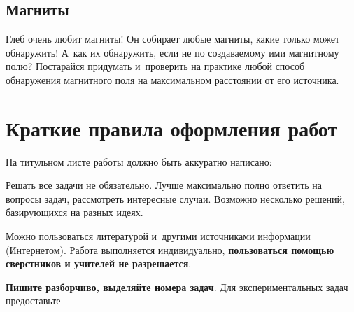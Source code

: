 \documentclass[a4paper,12pt]{article}
\begin{document}
\subsection{Магниты}
Глеб очень любит магниты! Он собирает любые магниты, какие только может обнаружить!
А~как их обнаружить, если не по создаваемому ими магнитному полю? Постарайся придумать
и~проверить на практике любой способ обнаружения магнитного поля
на максимальном расстоянии от его источника.


\section*{Краткие правила оформления работ}
\footnotesize
На титульном листе работы должно быть аккуратно написано:

Решать все задачи не обязательно. Лучше максимально полно ответить на вопросы задач,
рассмотреть интересные случаи. Возможно несколько решений, базирующихся
на разных идеях.

Можно пользоваться литературой и~другими источниками информации (Интернетом).
Работа выполняется индивидуально, \textbf{пользоваться помощью сверстников и учителей не разрешается}.

\textbf{Пишите разборчиво, выделяйте номера задач}.
Для экспериментальных задач предоставьте
\end{document}
